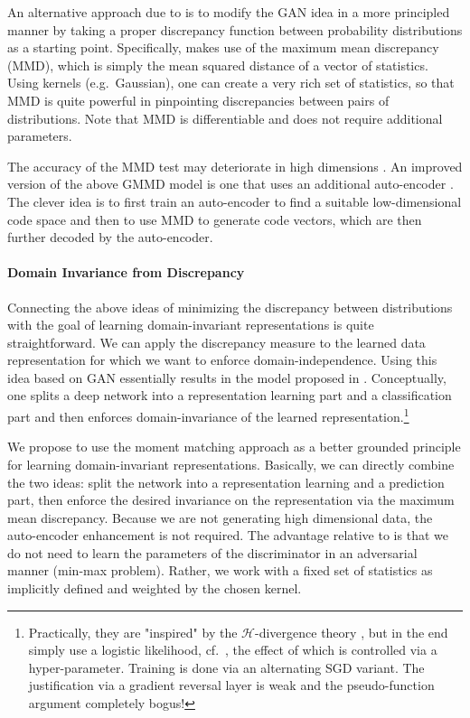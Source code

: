 \documentclass{article}
\renewcommand{\H}{{\mathcal H}}
\begin{document}
An alternative approach due to \cite{li2015generative} is to modify the GAN idea in a more principled manner by taking a  proper discrepancy function between probability distributions as a starting point. Specifically, \cite{li2015generative} makes use of the maximum mean discrepancy (MMD), which is simply the mean squared distance of a vector of statistics. Using kernels (e.g.~Gaussian), one can create a very rich set of statistics, so that MMD is quite powerful in pinpointing discrepancies between pairs of distributions. Note that MMD is differentiable \cite[Eq.~(6)]{li2015generative} and does not require additional parameters. 

The accuracy of the MMD test may deteriorate in high dimensions \cite{ramdas2015decreasing}. An improved version of the above GMMD model is one that uses an additional auto-encoder \cite[Section 4.2]{li2015generative}. The clever idea is to first train an auto-encoder to find a suitable low-dimensional code space and then to use MMD to generate code vectors, which are then further decoded by the auto-encoder.

\paragraph{Domain Invariance from Discrepancy}  Connecting the above ideas of minimizing the discrepancy between distributions with the goal of learning domain-invariant representations is quite straightforward. We can apply the discrepancy measure to the learned data representation for which we want to enforce domain-independence. Using this idea based on GAN essentially results in the model proposed in  \cite{ganin2016domain}. Conceptually, one splits a deep network into a representation learning part and a classification part and then enforces domain-invariance of the learned representation.\footnote{Practically, they are "inspired"  by the $\H$-divergence theory \cite{ben2007analysis}, but in the end  simply use a logistic likelihood, cf.~\cite[Eq.~(7)+]{ganin2016domain}, the effect of which is controlled via a hyper-parameter. Training is done via an alternating SGD variant. The justification via a gradient reversal layer is weak and the pseudo-function argument completely bogus!}

We propose to use the moment matching approach as a better grounded principle for learning domain-invariant representations. Basically, we can directly combine the two ideas: split the network into a representation learning and a prediction part, then enforce the desired invariance on the representation via the maximum mean discrepancy. Because we are not generating high dimensional data, the auto-encoder enhancement is not required. The advantage relative to  \cite{ganin2016domain} is that we do not need to learn the parameters of the discriminator in an adversarial manner (min-max problem). Rather, we work with a fixed set of statistics as implicitly defined and weighted by the chosen kernel.
\end{document}

